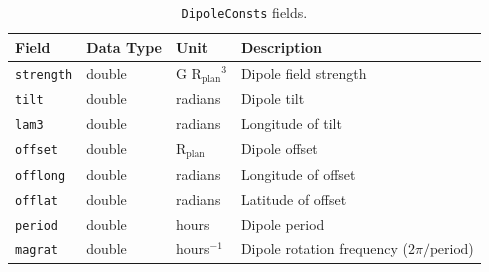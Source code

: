 \documentclass[11pt]{article}
\newcommand\Rplan{R$_{\mathrm{plan}}$}
\begin{document}
\begin{table}
\begin{tabular}{llll}
\textbf{Field} & \textbf{Data Type} & \textbf{Unit} & \textbf{Description}
  \\ \hline 
\texttt{strength} & double & G \Rplan$^3$ & Dipole field strength \\
\texttt{tilt} & double & radians & Dipole tilt \\
\texttt{lam3} & double & radians & Longitude of tilt \\
\texttt{offset} & double & \Rplan & Dipole offset \\
\texttt{offlong} & double & radians & Longitude of offset \\
\texttt{offlat} & double & radians & Latitude of offset \\
\texttt{period} & double & hours & Dipole period \\
\texttt{magrat} & double & hours$^{-1}$ & Dipole rotation frequency 
   ($2\pi/\mathrm{period}$)
\end{tabular}
\caption{\texttt{DipoleConsts} fields.}
\label{table:dipoleconsts}
\end{table}
\clearpage
\end{document}

